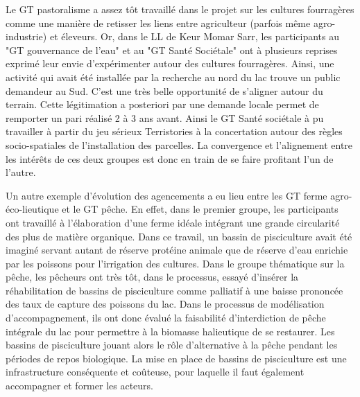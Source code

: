 \documentclass{article}
\begin{document}
Le GT pastoralisme a assez tôt travaillé dans le projet sur les cultures fourragères comme une manière de retisser les liens entre agriculteur (parfois même agro-industrie) et éleveurs. Or, dans le LL de Keur Momar Sarr, les participants au "GT gouvernance de l'eau" et au "GT Santé Sociétale" ont à plusieurs reprises exprimé leur envie d'expérimenter autour des cultures fourragères. Ainsi, une activité qui avait été installée par la recherche au nord du lac trouve un public demandeur au Sud. C'est une très belle opportunité de s'aligner autour du terrain. Cette légitimation a posteriori par une demande locale permet de remporter un pari réalisé 2 à 3 ans avant. Ainsi le GT Santé sociétale à pu travailler à partir du jeu sérieux Terristories à la concertation autour des règles socio-spatiales de l'installation des parcelles. La convergence et l'alignement entre les intérêts de ces deux groupes est donc en train de se faire profitant l'un de l'autre.

Un autre exemple d'évolution des agencements a eu lieu entre les GT ferme agro-éco-lieutique et le GT pêche. En effet, dans le premier groupe, les participants ont travaillé à l'élaboration d'une ferme idéale intégrant une grande circularité des plus de matière organique. Dans ce travail, un bassin de pisciculture avait été imaginé servant autant de réserve protéine animale que de réserve d'eau enrichie par les poissons pour l'irrigation des cultures. Dans le groupe thématique sur la pêche, les pêcheurs ont très tôt, dans le processus, essayé d'insérer la réhabilitation de bassins de pisciculture comme palliatif à une baisse prononcée des taux de capture des poissons du lac. Dans le processus de modélisation d'accompagnement, ils ont donc évalué la faisabilité d'interdiction de pêche intégrale du lac pour permettre à la biomasse halieutique de se restaurer. Les bassins de pisciculture jouant alors le rôle d'alternative à la pêche pendant les périodes de repos biologique. La mise en place de bassins de pisciculture est une infrastructure conséquente et coûteuse, pour laquelle il faut également accompagner et former les acteurs.


\end{document}
